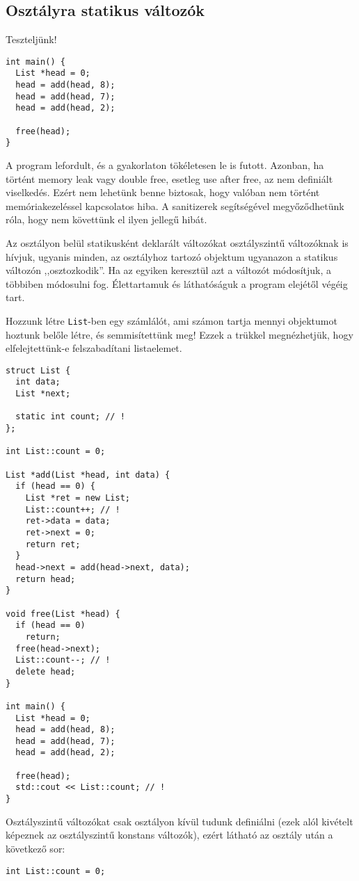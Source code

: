 \documentclass[../cpp_book/cpp_book.tex]{subfiles}
\begin{document}
	\subsection{Osztályra statikus változók}
	Teszteljünk!
	\begin{lstlisting}
int main() {
  List *head = 0;
  head = add(head, 8);
  head = add(head, 7);
  head = add(head, 2);

  free(head);
}
	\end{lstlisting}
	A program lefordult, és a gyakorlaton tökéletesen le is futott. Azonban, ha történt memory leak vagy double free, esetleg use after free, az nem definiált viselkedés. Ezért nem lehetünk benne biztosak, hogy valóban nem történt memóriakezeléssel kapcsolatos hiba. A sanitizerek segítségével megyőződhetünk róla, hogy nem követtünk el ilyen jellegű hibát.
	
	\smallskip
	Az osztályon belül statikusként deklarált változókat osztályszintű változóknak is hívjuk, ugyanis minden, az osztályhoz tartozó objektum ugyanazon a statikus változón ,,osztozkodik''. Ha az egyiken keresztül azt a változót módosítjuk, a többiben módosulni fog. Élettartamuk és láthatóságuk a program elejétől végéig tart.
	
	Hozzunk létre \texttt{List}-ben egy számlálót, ami számon tartja mennyi objektumot hoztunk belőle létre, és semmisítettünk meg! Ezzek a trükkel megnézhetjük, hogy elfelejtettünk-e felszabadítani listaelemet.
	\begin{lstlisting}
struct List {
  int data;
  List *next;

  static int count; // !
};

int List::count = 0;

List *add(List *head, int data) {
  if (head == 0) {
    List *ret = new List;
    List::count++; // !
    ret->data = data;
    ret->next = 0;
    return ret;
  }
  head->next = add(head->next, data);
  return head;
}

void free(List *head) {
  if (head == 0)
    return;
  free(head->next);
  List::count--; // !
  delete head;
}

int main() {
  List *head = 0;
  head = add(head, 8);
  head = add(head, 7);
  head = add(head, 2);

  free(head);
  std::cout << List::count; // !
}
	\end{lstlisting}
	
	Osztályszintű változókat csak osztályon kívül tudunk definiálni (ezek alól kivételt képeznek az osztályszintű konstans változók), ezért látható az osztály után a következő sor:
	\begin{lstlisting}
int List::count = 0;
	\end{lstlisting}
	
\end{document}

